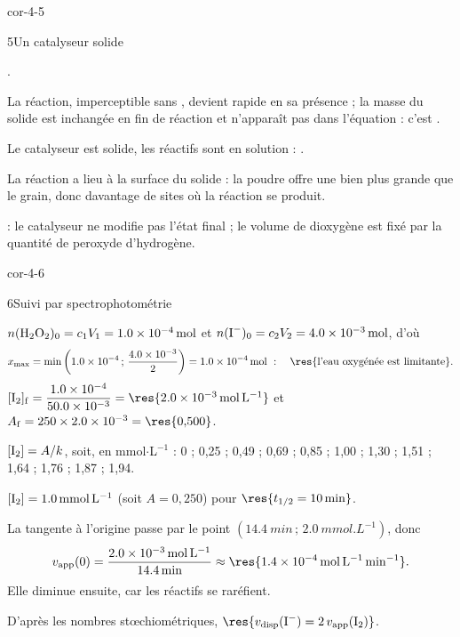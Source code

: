 \begin{blocLivre}{cor-4-5}
\begin{corrige}{5}{Un catalyseur solide}
\begin{questions}
\item {}.
\item La réaction, imperceptible sans , devient rapide en sa présence ; la masse du solide est inchangée en fin
de réaction et  n'apparaît pas dans l'équation : c'est .
\item Le catalyseur est solide, les réactifs sont en solution : .
\item La réaction a lieu à la surface du solide : la poudre offre une  bien plus grande
que le grain, donc davantage de sites où la réaction se produit.
\item {} : le catalyseur ne modifie pas l'état final ; le volume de dioxygène est fixé par la quantité
de peroxyde d'hydrogène.
\end{questions}
\end{corrige}
\end{blocLivre}
\begin{blocLivre}{cor-4-6}
\begin{corrige}{6}{Suivi par spectrophotométrie}
\begin{questions}
\item $n(\ce{H2O2})_0=c_1V_1=\qty{1,0e-4}{mol}$ et $n(\ce{I-})_0=c_2V_2=\qty{4,0e-3}{mol}$, d'où
\[x_{\max}=\min\left(\num{1.0e-4}\,;\,\frac{\num{4.0e-3}}{2}\right)=\qty{1,0e-4}{mol}\ :\quad\res{\text{l'eau oxygénée est limitante}}.\]
$[\ce{I2}]_\mathrm{f}=\dfrac{\num{1.0e-4}}{\num{50.0e-3}}=\res{\qty{2,0e-3}{mol.L^{-1}}}$ et $A_\mathrm{f}=250\times\num{2.0e-3}=\res{0{,}500}$.
\item $[\ce{I2}]=A/k$, soit, en mmol$\cdot$L$^{-1}$ : 0 ; 0,25 ; 0,49 ; 0,69 ; 0,85 ; 1,00 ; 1,30 ; 1,51 ; 1,64 ; 1,76 ; 1,87 ; 1,94.
\item $[\ce{I2}]=\qty{1,0}{mmol.L^{-1}}$ (soit $A=0{,}250$) pour $\res{t_{1/2}=\qty{10}{min}}$.
\item La tangente à l'origine passe par le point $(\qty{14,4}{min}\,;\,\qty{2,0}{mmol.L^{-1}})$, donc
\[v_\mathrm{app}(0)=\frac{\qty{2,0e-3}{mol.L^{-1}}}{\qty{14,4}{min}}\approx\res{\qty{1,4e-4}{mol.L^{-1}.min^{-1}}}.\]
Elle diminue ensuite, car les réactifs se raréfient.
\item D'après les nombres stœchiométriques, $\res{v_\mathrm{disp}(\ce{I-})=2\,v_\mathrm{app}(\ce{I2})}$.
\end{questions}
\end{corrige}
\end{blocLivre}
